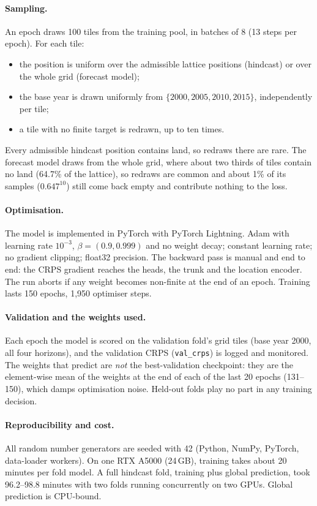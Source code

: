 \documentclass[11pt,a4paper]{article}
\newcommand{\code}[1]{\texttt{\small #1}}
\begin{document}
\paragraph{Sampling.} An epoch draws 100 tiles from the training pool, in batches of 8 (13
steps per epoch). For each tile:
\begin{itemize}
\item the position is uniform over the admissible lattice positions (hindcast) or over the whole
  grid (forecast model);
\item the base year is drawn uniformly from $\{2000, 2005, 2010, 2015\}$, independently per tile;
\item a tile with no finite target is redrawn, up to ten times.
\end{itemize}
Every admissible hindcast position contains land, so redraws there are rare. The forecast model
draws from the whole grid, where about two thirds of tiles contain no land (64.7\% of the lattice),
so redraws are common and about 1\% of its samples ($0.647^{10}$) still come back empty and
contribute nothing to the loss.

\paragraph{Optimisation.} The model is implemented in PyTorch \citep{pytorch} with PyTorch
Lightning. Adam with learning rate $10^{-3}$, $\beta=(0.9,0.999)$ and no weight
decay; constant learning rate; no gradient clipping; float32 precision. The backward pass is
manual and end to end: the CRPS gradient reaches the heads, the trunk and the location encoder.
The run aborts if any weight becomes non-finite at the end of an epoch. Training lasts 150 epochs,
1,950 optimiser steps.

\paragraph{Validation and the weights used.} Each epoch the model is scored on the validation
fold's grid tiles (base year 2000, all four horizons), and the validation CRPS
(\code{val\_crps}) is logged and monitored. The weights that predict are \emph{not} the
best-validation checkpoint: they are the element-wise mean of the weights at the end of each of
the last 20 epochs (131--150), which damps optimisation noise. Held-out folds play no part in any
training decision.

\paragraph{Reproducibility and cost.} All random number generators are seeded with 42
(Python, NumPy, PyTorch, data-loader workers). On one RTX A5000 (24\,GB), training takes about
20 minutes per fold model. A full hindcast fold, training plus global prediction, took 96.2--98.8
minutes with two folds running concurrently on two GPUs. Global prediction is CPU-bound.
\end{document}
